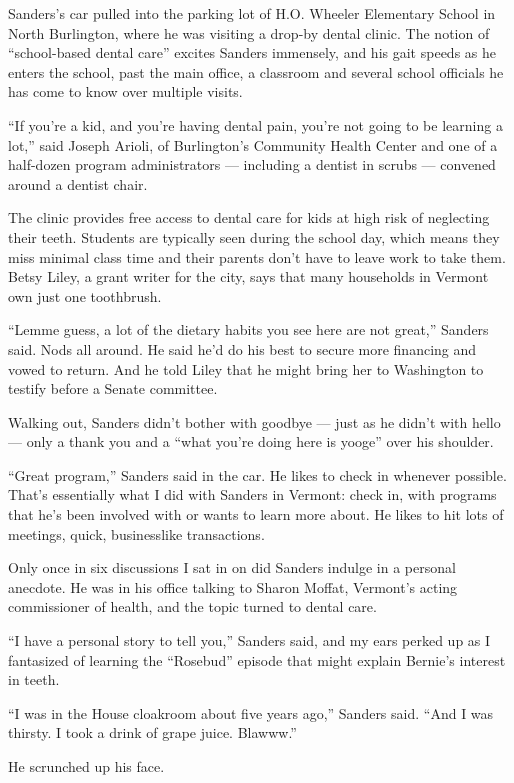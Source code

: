 Sanders's car pulled into the parking lot of H.O. Wheeler Elementary
School in North Burlington, where he was visiting a drop-by dental
clinic. The notion of ``school-based dental care'' excites Sanders
immensely, and his gait speeds as he enters the school, past the main
office, a classroom and several school officials he has come to know
over multiple visits.

``If you're a kid, and you're having dental pain, you're not going to be
learning a lot,'' said Joseph Arioli, of Burlington's Community Health
Center and one of a half-dozen program administrators --- including a
dentist in scrubs --- convened around a dentist chair.

The clinic provides free access to dental care for kids at high risk of
neglecting their teeth. Students are typically seen during the school
day, which means they miss minimal class time and their parents don't
have to leave work to take them. Betsy Liley, a grant writer for the
city, says that many households in Vermont own just one toothbrush.

``Lemme guess, a lot of the dietary habits you see here are not great,''
Sanders said. Nods all around. He said he'd do his best to secure more
financing and vowed to return. And he told Liley that he might bring her
to Washington to testify before a Senate committee.

Walking out, Sanders didn't bother with goodbye --- just as he didn't
with hello --- only a thank you and a ``what you're doing here is
yooge'' over his shoulder.

``Great program,'' Sanders said in the car. He likes to check in
whenever possible. That's essentially what I did with Sanders in
Vermont: check in, with programs that he's been involved with or wants
to learn more about. He likes to hit lots of meetings, quick,
businesslike transactions.

Only once in six discussions I sat in on did Sanders indulge in a
personal anecdote. He was in his office talking to Sharon Moffat,
Vermont's acting commissioner of health, and the topic turned to dental
care.

``I have a personal story to tell you,'' Sanders said, and my ears
perked up as I fantasized of learning the ``Rosebud'' episode that might
explain Bernie's interest in teeth.

``I was in the House cloakroom about five years ago,'' Sanders said.
``And I was thirsty. I took a drink of grape juice. Blawww.''

He scrunched up his face.

